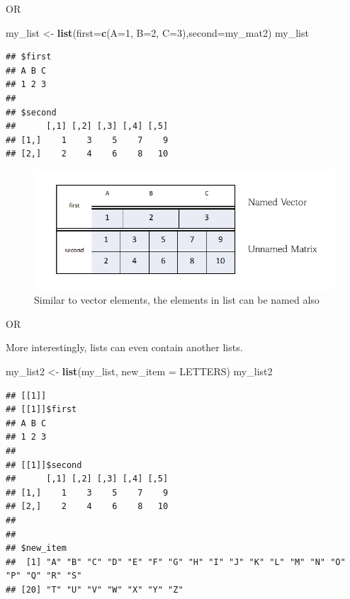 \documentclass[
]{book}
\newenvironment{Shaded}{\begin{snugshade}}{\end{snugshade}}
\newcommand{\AttributeTok}[1]{\textcolor[rgb]{0.13,0.29,0.53}{#1}}
\newcommand{\DecValTok}[1]{\textcolor[rgb]{0.00,0.00,0.81}{#1}}
\newcommand{\FunctionTok}[1]{\textcolor[rgb]{0.13,0.29,0.53}{\textbf{#1}}}
\newcommand{\NormalTok}[1]{#1}
\newcommand{\OtherTok}[1]{\textcolor[rgb]{0.56,0.35,0.01}{#1}}
\begin{document}
OR

\begin{Shaded}
\begin{Highlighting}[]
\NormalTok{my\_list }\OtherTok{\textless{}{-}} \FunctionTok{list}\NormalTok{(}\AttributeTok{first=}\FunctionTok{c}\NormalTok{(}\AttributeTok{A=}\DecValTok{1}\NormalTok{, }\AttributeTok{B=}\DecValTok{2}\NormalTok{, }\AttributeTok{C=}\DecValTok{3}\NormalTok{),}\AttributeTok{second=}\NormalTok{my\_mat2)}
\NormalTok{my\_list}
\end{Highlighting}
\end{Shaded}

\begin{verbatim}
## $first
## A B C 
## 1 2 3 
## 
## $second
##      [,1] [,2] [,3] [,4] [,5]
## [1,]    1    3    5    7    9
## [2,]    2    4    6    8   10
\end{verbatim}

\begin{figure}

{\centering \includegraphics[width=0.99\linewidth]{images/named_list} 

}

\caption{Similar to vector elements, the elements in list can be named also}\label{fig:namedlist}
\end{figure}

OR

More interestingly, lists can even contain another lists.

\begin{Shaded}
\begin{Highlighting}[]
\NormalTok{my\_list2 }\OtherTok{\textless{}{-}} \FunctionTok{list}\NormalTok{(my\_list, }\AttributeTok{new\_item =}\NormalTok{ LETTERS)}
\NormalTok{my\_list2}
\end{Highlighting}
\end{Shaded}

\begin{verbatim}
## [[1]]
## [[1]]$first
## A B C 
## 1 2 3 
## 
## [[1]]$second
##      [,1] [,2] [,3] [,4] [,5]
## [1,]    1    3    5    7    9
## [2,]    2    4    6    8   10
## 
## 
## $new_item
##  [1] "A" "B" "C" "D" "E" "F" "G" "H" "I" "J" "K" "L" "M" "N" "O" "P" "Q" "R" "S"
## [20] "T" "U" "V" "W" "X" "Y" "Z"
\end{verbatim}
\end{document}
